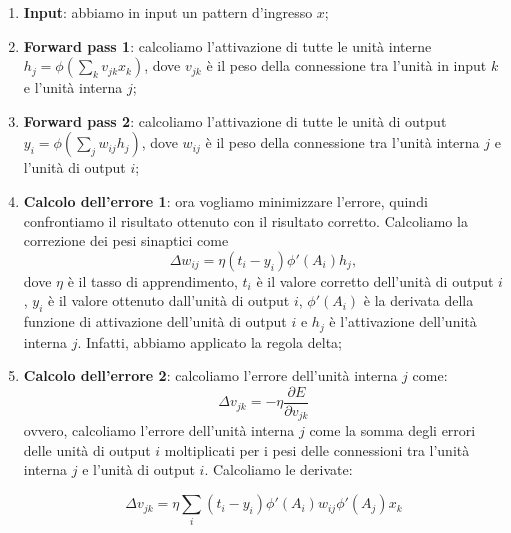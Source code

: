 \begin{enumerate}
	\item \textbf{Input}: abbiamo in input un pattern d'ingresso $x$;

	\item \textbf{Forward pass 1}: calcoliamo l'attivazione di tutte le unità
	      interne $h_j = \phi(\sum_{k} v_{jk} x_k)$, dove $v_{jk}$ è il
	      peso della connessione tra l'unità in input $k$ e l'unità interna $j$;

	\item \textbf{Forward pass 2}: calcoliamo l'attivazione di tutte le unità di
	      output $y_i = \phi(\sum_{j} w_{ij} h_j)$, dove $w_{ij}$ è il peso
	      della connessione tra l'unità interna $j$ e l'unità di output $i$;

	\item \textbf{Calcolo dell'errore 1}: ora vogliamo minimizzare l'errore, quindi
	      confrontiamo il risultato ottenuto con il risultato corretto. Calcoliamo
	      la correzione dei pesi sinaptici come
	      \begin{equation*}
		      \Delta w_{ij} = \eta (t_i - y_i) \phi'(A_i) h_j,
	      \end{equation*}
	      dove $\eta$ è il tasso di apprendimento, $t_i$ è il
	      valore corretto dell'unità di output $i$, $y_i$ è il valore ottenuto
	      dall'unità di output $i$, $\phi'(A_i)$ è la derivata della funzione di
	      attivazione dell'unità di output $i$ e $h_j$ è l'attivazione dell'unità
	      interna $j$. Infatti, abbiamo applicato la regola delta;

	\item \textbf{Calcolo dell'errore 2}: calcoliamo l'errore dell'unità interna
	      $j$ come:
	      \begin{equation}
		      \Delta v_{jk} = - \eta \frac{\partial E}{\partial v_{jk}}
	      \end{equation}
	      ovvero, calcoliamo l'errore dell'unità interna $j$ come la somma degli
	      errori delle unità di output $i$ moltiplicati per i pesi delle
	      connessioni tra l'unità interna $j$ e l'unità di output $i$.
	      Calcoliamo le derivate:

	      \begin{equation}
		      \Delta v_{jk} = \eta \sum_{i} (t_i - y_i) \phi'(A_i) w_{ij} \phi'(A_j) x_k
	      \end{equation}
\end{enumerate}

